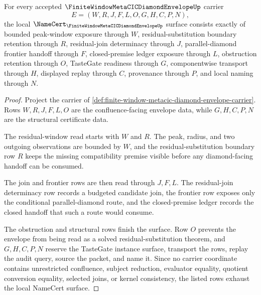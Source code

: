 \begin{theorem}
\label{thm:finite-window-metacic-diamond-envelope-namecert-obligations}
For every accepted $\FiniteWindowMetaCICDiamondEnvelopeUp$ carrier
$$
E=(W,R,J,F,L,O,G,H,C,P,N),
$$
the local $\NameCert_{\FiniteWindowMetaCICDiamondEnvelopeUp}$ surface consists exactly of bounded peak-window exposure through $W$, residual-substitution boundary retention through $R$, residual-join determinacy through $J$, parallel-diamond frontier handoff through $F$, closed-premise ledger exposure through $L$, obstruction retention through $O$, TasteGate readiness through $G$, componentwise transport through $H$, displayed replay through $C$, provenance through $P$, and local naming through $N$.
\end{theorem}
\begin{proof}
Project the carrier of \autoref{def:finite-window-metacic-diamond-envelope-carrier}. Rows $W,R,J,F,L,O$ are the confluence-facing envelope data, while $G,H,C,P,N$ are the structural certificate data.

The residual-window read starts with $W$ and $R$. The peak, radius, and two outgoing observations are bounded by $W$, and the residual-substitution boundary row $R$ keeps the missing compatibility premise visible before any diamond-facing handoff can be consumed.

The join and frontier rows are then read through $J,F,L$. The residual-join determinacy row records a budgeted candidate join, the frontier row exposes only the conditional parallel-diamond route, and the closed-premise ledger records the closed handoff that such a route would consume.

The obstruction and structural rows finish the surface. Row $O$ prevents the envelope from being read as a solved residual-substitution theorem, and $G,H,C,P,N$ reserve the TasteGate instance surface, transport the rows, replay the audit query, source the packet, and name it. Since no carrier coordinate contains unrestricted confluence, subject reduction, evaluator equality, quotient conversion equality, selected joins, or kernel consistency, the listed rows exhaust the local NameCert surface.
\end{proof}

